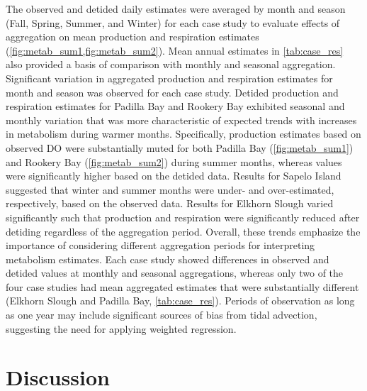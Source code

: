 \documentclass[letterpaper,12pt,oneside]{article}\usepackage[]{graphicx}\usepackage[]{color}
\begin{document}
The observed and detided daily estimates were averaged by month and season (Fall, Spring, Summer, and Winter) for each case study to evaluate effects of aggregation on mean production and respiration estimates (\cref{fig:metab_sum1,fig:metab_sum2}).  Mean annual estimates in \cref{tab:case_res} also provided a basis of comparison with monthly and seasonal aggregation. Significant variation in aggregated production and respiration estimates for month and season was observed for each case study.  Detided production and respiration estimates for Padilla Bay and Rookery Bay exhibited seasonal and monthly variation that was more characteristic of expected trends with increases in metabolism during warmer months.  Specifically, production estimates based on observed \ac{DO} were substantially muted for both Padilla Bay (\cref{fig:metab_sum1}) and Rookery Bay (\cref{fig:metab_sum2}) during summer months, whereas values were significantly higher based on the detided data. Results for Sapelo Island suggested that winter and summer months were under- and over-estimated, respectively, based on the observed data.  Results for Elkhorn Slough varied significantly such that production and respiration were significantly reduced after detiding regardless of the aggregation period.  Overall, these trends emphasize the importance of considering different aggregation periods for interpreting metabolism estimates.  Each case study showed differences in observed and detided values at monthly and seasonal aggregations, whereas only two of the four case studies had mean aggregated estimates that were substantially different (Elkhorn Slough and Padilla Bay, \cref{tab:case_res}).  Periods of observation as long as one year may include significant sources of bias from tidal advection, suggesting the need for applying weighted regression.       

 

\section{Discussion}
\end{document}
